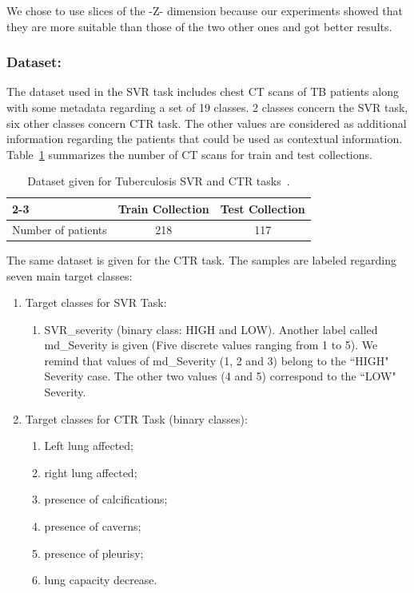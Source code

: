 \documentclass{llncs}
\begin{document}
We chose to use slices of the -Z- dimension because our experiments showed that they are more suitable than those of the two other ones and got better results.

\subsubsection{Dataset:}
The dataset used in the SVR task includes chest CT scans of TB patients along with some metadata regarding a set of 19 classes. 2 classes concern the SVR task, six other classes concern CTR task. The other values are considered as additional information regarding the patients that could be used as contextual information. Table~\ref{tab1} summarizes the number of CT scans for train and test collections.

\begin{table}
\center
\caption{Dataset given for Tuberculosis SVR and CTR tasks~\cite{ImageCLEF19}.}
\label{tab1}
\begin{tabular}{|l|c|c|}
\cline{2-3}
\multicolumn{1}{}{}  &     \multicolumn{1}{|c|}{Train Collection}  &    \multicolumn{1}{|c|}{Test Collection}  \\
\hline
Number of patients             &    218                     &        117\\
\hline
\end{tabular}
\end{table}

The same dataset is given for the CTR task. The samples are labeled regarding seven main target classes: 
\begin{enumerate}
\item Target classes for SVR Task:
\begin{enumerate}
\item SVR\_severity (binary class: HIGH and LOW). Another label called md\_Severity is given (Five discrete values ranging from 1 to 5). We remind that values of md\_Severity (1, 2 and 3) belong to the ``HIGH" Severity case. The other two values (4 and 5) correspond to the ``LOW" Severity.
\end{enumerate}
\item Target classes for CTR Task (binary classes):
\begin{enumerate}
\item Left lung affected;
\item right lung affected;
\item presence of calcifications;
\item presence of caverns;
\item presence of pleurisy;
\item lung capacity decrease.
\end{enumerate}
\end{enumerate}
\end{document}
